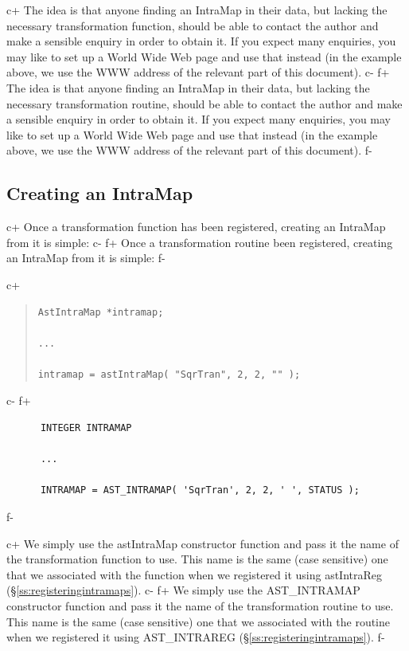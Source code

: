 \documentclass[twoside,11pt]{article}
\newcommand{\secref}[1]{\S\ref{#1}}
\newcommand{\secref}[1]{\ref{#1}}
\begin{document}
c+
The idea is that anyone finding an IntraMap in their data, but lacking
the necessary transformation function, should be able to contact the
author and make a sensible enquiry in order to obtain it. If you
expect many enquiries, you may like to set up a World Wide Web page
and use that instead (in the example above, we use the WWW address of
the relevant part of this document).
c-
f+
The idea is that anyone finding an IntraMap in their data, but lacking
the necessary transformation routine, should be able to contact the
author and make a sensible enquiry in order to obtain it. If you
expect many enquiries, you may like to set up a World Wide Web page
and use that instead (in the example above, we use the WWW address of
the relevant part of this document).
f-

\subsection{Creating an IntraMap}

c+
Once a transformation function has been registered, creating an
IntraMap from it is simple:
c-
f+
Once a transformation routine been registered, creating an IntraMap
from it is simple:
f-

c+
\begin{quote}
\small
\begin{verbatim}
AstIntraMap *intramap;

...

intramap = astIntraMap( "SqrTran", 2, 2, "" );
\end{verbatim}
\normalsize
\end{quote}
c-
f+
\small
\begin{verbatim}
      INTEGER INTRAMAP

      ...

      INTRAMAP = AST_INTRAMAP( 'SqrTran', 2, 2, ' ', STATUS );
\end{verbatim}
\normalsize
f-

c+
We simply use the astIntraMap constructor function and pass it the
name of the transformation function to use. This name is the same
(case sensitive) one that we associated with the function when we
registered it using astIntraReg (\secref{ss:registeringintramaps}).
c-
f+
We simply use the AST\_INTRAMAP constructor function and pass it the
name of the transformation routine to use. This name is the same (case
sensitive) one that we associated with the routine when we registered
it using AST\_INTRAREG (\secref{ss:registeringintramaps}).
f-
\end{document}
